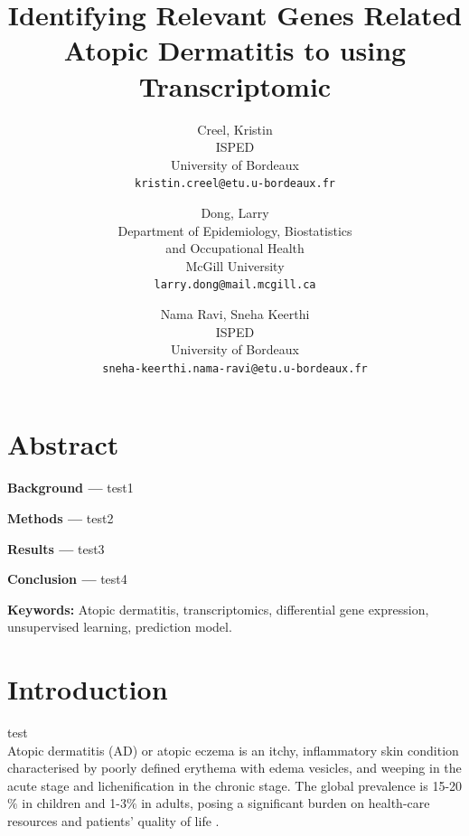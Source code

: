\documentclass[journal, a4paper]{IEEEtran}
\begin{document}
\title{\Large{Identifying Relevant Genes Related Atopic Dermatitis  to  using Transcriptomic}}
\author{%
\begin{tabular}{c} Creel, Kristin \\ ISPED \\ University of Bordeaux \\ \texttt{kristin.creel@etu.u-bordeaux.fr} \end{tabular} \and
\begin{tabular}{c} Dong, Larry \\ Department of Epidemiology, Biostatistics \\ and Occupational Health \\ McGill University \\ \texttt{larry.dong@mail.mcgill.ca} \end{tabular} \and
\begin{tabular}{c} Nama Ravi, Sneha Keerthi \\ ISPED \\ University of Bordeaux \\ \texttt{sneha-keerthi.nama-ravi@etu.u-bordeaux.fr} \end{tabular}}
\maketitle





\section*{Abstract}

\textbf{Background --- } test1

\textbf{Methods ---} test2

\textbf{Results ---} test3

\textbf{Conclusion ---} test4

\textbf{Keywords:} Atopic dermatitis, transcriptomics, differential gene expression, unsupervised learning, prediction model.

\section{Introduction}
test\\

Atopic dermatitis (AD) or atopic eczema is an itchy, inflammatory skin condition characterised by poorly defined erythema with edema vesicles, and weeping in the acute stage and lichenification in the chronic stage. The global prevalence is 15-20 $\%$ in children and 1-3$\%$ in adults, posing a significant burden on health-care resources and patients’ quality of life \cite{nutten2015atopic}.\\
\end{document}
